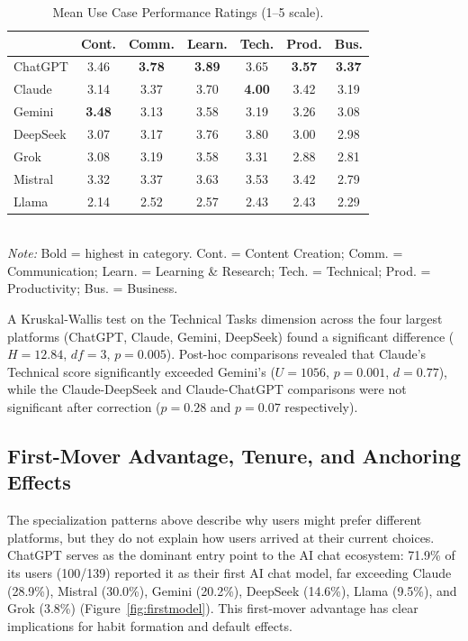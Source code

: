 \documentclass[10pt,twocolumn]{article}
\begin{document}
\begin{table}[t]
\centering
\caption{Mean Use Case Performance Ratings (1--5 scale).}
\label{tab:usecase}
\small
\setlength{\tabcolsep}{3pt}
\begin{tabular}{lcccccc}
\toprule
 & \textbf{Cont.} & \textbf{Comm.} & \textbf{Learn.} & \textbf{Tech.} & \textbf{Prod.} & \textbf{Bus.} \\
\midrule
ChatGPT & 3.46 & \textbf{3.78} & \textbf{3.89} & 3.65 & \textbf{3.57} & \textbf{3.37} \\
Claude & 3.14 & 3.37 & 3.70 & \textbf{4.00} & 3.42 & 3.19 \\
Gemini & \textbf{3.48} & 3.13 & 3.58 & 3.19 & 3.26 & 3.08 \\
DeepSeek & 3.07 & 3.17 & 3.76 & 3.80 & 3.00 & 2.98 \\
Grok & 3.08 & 3.19 & 3.58 & 3.31 & 2.88 & 2.81 \\
Mistral & 3.32 & 3.37 & 3.63 & 3.53 & 3.42 & 2.79 \\
Llama & 2.14 & 2.52 & 2.57 & 2.43 & 2.43 & 2.29 \\
\bottomrule
\end{tabular}
\vspace{2pt}
\\\footnotesize\textit{Note:} Bold = highest in category. Cont. = Content Creation; Comm. = Communication; Learn. = Learning \& Research; Tech. = Technical; Prod. = Productivity; Bus. = Business.
\end{table}

A Kruskal-Wallis test on the Technical Tasks dimension across the four largest platforms (ChatGPT, Claude, Gemini, DeepSeek) found a significant difference ($H=12.84$, $df=3$, $p=0.005$). Post-hoc comparisons revealed that Claude's Technical score significantly exceeded Gemini's ($U=1056$, $p=0.001$, $d=0.77$), while the Claude-DeepSeek and Claude-ChatGPT comparisons were not significant after correction ($p=0.28$ and $p=0.07$ respectively).

\subsection{First-Mover Advantage, Tenure, and Anchoring Effects}

The specialization patterns above describe why users might prefer different platforms, but they do not explain how users arrived at their current choices. ChatGPT serves as the dominant entry point to the AI chat ecosystem: 71.9\% of its users (100/139) reported it as their first AI chat model, far exceeding Claude (28.9\%), Mistral (30.0\%), Gemini (20.2\%), DeepSeek (14.6\%), Llama (9.5\%), and Grok (3.8\%) (Figure~\ref{fig:firstmodel}). This first-mover advantage has clear implications for habit formation and default effects.
\end{document}
